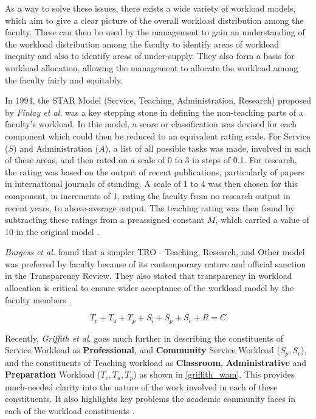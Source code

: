 As a way to solve these issues, there exists a wide variety of workload models, which aim to give a clear picture of the overall workload distribution among the faculty. These can then be used by the management to gain an understanding of the workload distribution among the faculty to identify areas of workload inequity and also to identify areas of under-supply. They also form a basis for workload allocation, allowing the management to allocate the workload among the faculty fairly and equitably.

In 1994, the STAR Model (Service, Teaching, Administration, Research) proposed by \textit{Finlay et al.} was a key stepping stone in defining the non-teaching parts of a faculty's workload. In this model, a score or classification was devised for each component which could then be reduced to an equivalent rating scale. For Service ($S$) and Administration ($A$), a list of all possible tasks was made, involved in each of these areas, and then rated on a scale of 0 to 3 in steps of 0.1. For research, the rating was based on the output of recent publications, particularly of papers in international journals of standing. A scale of 1 to 4 was then chosen for this component, in increments of 1, rating the faculty from no research output in recent years, to above-average output. The teaching rating was then found by subtracting these ratings from a preassigned constant $M$, which carried a value of 10 in the original model \cite{finlay1994management}.

\textit{Burgess et al.} found that a simpler TRO - Teaching, Research, and Other model was preferred by faculty because of its contemporary nature and official sanction in the Transparency Review. They also stated that transparency in workload allocation is critical to ensure wider acceptance of the workload model by the faculty members \cite{burgess2003academic}.


\begin{equation}
  T_c + T_a + T_p + S_i + S_p + S_c+R = C
  \label{griffith_wam}
\end{equation}

Recently, \textit{Griffith et al.} goes much further in describing the constituents of Service Workload as \textbf{Professional}, and \textbf{Community} Service Workload (\(S_p, S_c\)), and the constituents of Teaching workload as \textbf{Classroom}, \textbf{Administrative} and \textbf{Preparation} Workload ($T_c, T_a, T_p$) as shown in \autoref{griffith_wam}. This provides much-needed clarity into the nature of the work involved in each of these constituents. It also highlights key problems the academic community faces in each of the workload constituents \cite{griffith2020framework}.

